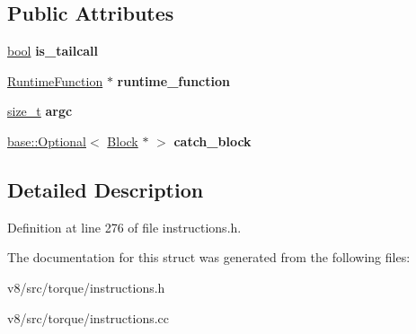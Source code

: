 \subsection*{Public Attributes}
\begin{DoxyCompactItemize}
\item 
\mbox{\label{structv8_1_1internal_1_1torque_1_1CallRuntimeInstruction_a41099b36ff83e5baffcc6d56704dc382}} 
\mbox{\hyperlink{classbool}{bool}} {\bfseries is\+\_\+tailcall}
\item 
\mbox{\label{structv8_1_1internal_1_1torque_1_1CallRuntimeInstruction_ae34058e37a8704bafcdb1f086d0b9b22}} 
\mbox{\hyperlink{classv8_1_1internal_1_1torque_1_1RuntimeFunction}{Runtime\+Function}} $\ast$ {\bfseries runtime\+\_\+function}
\item 
\mbox{\label{structv8_1_1internal_1_1torque_1_1CallRuntimeInstruction_a3c51fab0f732879557a6754999a63075}} 
\mbox{\hyperlink{classsize__t}{size\+\_\+t}} {\bfseries argc}
\item 
\mbox{\label{structv8_1_1internal_1_1torque_1_1CallRuntimeInstruction_ab2d60a5f69b14bffc959899f71d6ce31}} 
\mbox{\hyperlink{classv8_1_1base_1_1Optional}{base\+::\+Optional}}$<$ \mbox{\hyperlink{classv8_1_1internal_1_1torque_1_1Block}{Block}} $\ast$ $>$ {\bfseries catch\+\_\+block}
\end{DoxyCompactItemize}


\subsection{Detailed Description}


Definition at line 276 of file instructions.\+h.



The documentation for this struct was generated from the following files\+:\begin{DoxyCompactItemize}
\item 
v8/src/torque/instructions.\+h\item 
v8/src/torque/instructions.\+cc\end{DoxyCompactItemize}
